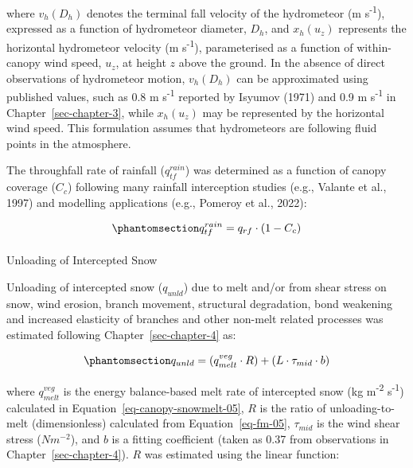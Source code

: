 \documentclass[
  letterpaper,
]{tex/uofsthesis-cs}
\makeatletter
\let\oldparagraph\paragraph
\renewcommand{\paragraph}{
    \@ifstar
      \xxxParagraphStar
      \xxxParagraphNoStar
  }
\newcommand{\xxxParagraphStar}[1]{\oldparagraph*{#1}\mbox{}}
\newcommand{\xxxParagraphNoStar}[1]{\oldparagraph{#1}\mbox{}}
\makeatother
\begin{document}
where \(v_h(D_h)\) denotes the terminal fall velocity of the hydrometeor
(m s\textsuperscript{-1}), expressed as a function of hydrometeor
diameter, \(D_h\), and \(x_h(u_z)\) represents the horizontal
hydrometeor velocity (m s\textsuperscript{-1}), parameterised as a
function of within-canopy wind speed, \(u_z\), at height \(z\) above the
ground. In the absence of direct observations of hydrometeor motion,
\(v_h(D_h)\) can be approximated using published values, such as 0.8 m
s\textsuperscript{-1} reported by Isyumov (1971) and 0.9 m
s\textsuperscript{-1} in Chapter~\ref{sec-chapter-3}, while \(x_h(u_z)\)
may be represented by the horizontal wind speed. This formulation
assumes that hydrometeors are following fluid points in the atmosphere.

The throughfall rate of rainfall (\(q_{tf}^{rain}\)) was determined as a
function of canopy coverage (\(C_c\)) following many rainfall
interception studies (e.g., Valante et al., 1997) and modelling
applications (e.g., Pomeroy et al., 2022):

\begin{equation}\phantomsection\label{eq-tf-rain}{
q_{tf}^{rain} = q_{rf} \cdot (1-C_c)
}\end{equation}

\paragraph{Unloading of Intercepted
Snow}\label{unloading-of-intercepted-snow}

Unloading of intercepted snow (\(q_{unld}\)) due to melt and/or from
shear stress on snow, wind erosion, branch movement, structural
degradation, bond weakening and increased elasticity of branches and
other non-melt related processes was estimated following
Chapter~\ref{sec-chapter-4} as:

\begin{equation}\phantomsection\label{eq-unld-05}{
q_{unld} = (q_{melt}^{veg} \cdot R) + (L \cdot \tau_{mid} \cdot b)
}\end{equation}

where \(q_{melt}^{veg}\) is the energy balance-based melt rate of
intercepted snow (kg m\textsuperscript{-2} s\textsuperscript{-1})
calculated in Equation~\ref{eq-canopy-snowmelt-05}, \(R\) is the ratio
of unloading-to-melt (dimensionless) calculated from
Equation~\ref{eq-fm-05}, \(\tau_{mid}\) is the wind shear stress
(\(N m^{-2}\)), and \(b\) is a fitting coefficient (taken as 0.37 from
observations in Chapter~\ref{sec-chapter-4}). \(R\) was estimated using
the linear function:
\end{document}

